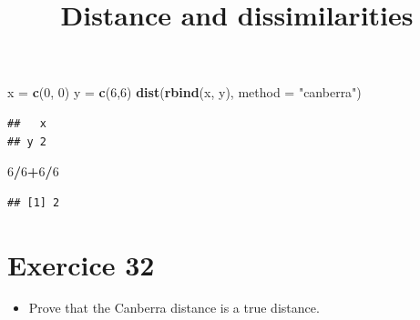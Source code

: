 \documentclass[
]{article}
\title{Distance and dissimilarities}
\author{}
\date{\vspace{-2.5em}}
\newenvironment{Shaded}{\begin{snugshade}}{\end{snugshade}}
\newcommand{\CommentTok}[1]{\textcolor[rgb]{0.56,0.35,0.01}{\textit{#1}}}
\newcommand{\DataTypeTok}[1]{\textcolor[rgb]{0.13,0.29,0.53}{#1}}
\newcommand{\DecValTok}[1]{\textcolor[rgb]{0.00,0.00,0.81}{#1}}
\newcommand{\KeywordTok}[1]{\textcolor[rgb]{0.13,0.29,0.53}{\textbf{#1}}}
\newcommand{\NormalTok}[1]{#1}
\newcommand{\OperatorTok}[1]{\textcolor[rgb]{0.81,0.36,0.00}{\textbf{#1}}}
\newcommand{\OtherTok}[1]{\textcolor[rgb]{0.56,0.35,0.01}{#1}}
\newcommand{\StringTok}[1]{\textcolor[rgb]{0.31,0.60,0.02}{#1}}
\providecommand{\tightlist}{%
  \setlength{\itemsep}{0pt}\setlength{\parskip}{0pt}}
\begin{document}
\maketitle

{
\setcounter{tocdepth}{2}
\tableofcontents
}
\begin{Shaded}
\end{Shaded}

\begin{Shaded}
\begin{Highlighting}[]
\NormalTok{x =}\StringTok{ }\KeywordTok{c}\NormalTok{(}\DecValTok{0}\NormalTok{, }\DecValTok{0}\NormalTok{)}
\NormalTok{y =}\StringTok{ }\KeywordTok{c}\NormalTok{(}\DecValTok{6}\NormalTok{,}\DecValTok{6}\NormalTok{)}
\KeywordTok{dist}\NormalTok{(}\KeywordTok{rbind}\NormalTok{(x, y), }\DataTypeTok{method =} \StringTok{"canberra"}\NormalTok{)}
\end{Highlighting}
\end{Shaded}

\begin{verbatim}
##   x
## y 2
\end{verbatim}

\begin{Shaded}
\begin{Highlighting}[]
\DecValTok{6}\OperatorTok{/}\DecValTok{6}\OperatorTok{+}\DecValTok{6}\OperatorTok{/}\DecValTok{6}
\end{Highlighting}
\end{Shaded}

\begin{verbatim}
## [1] 2
\end{verbatim}

\hypertarget{exercice-32}{%
\section{Exercice 32}\label{exercice-32}}

\begin{itemize}
\tightlist
\item
  Prove that the Canberra distance is a true distance.
\end{itemize}
\end{document}
